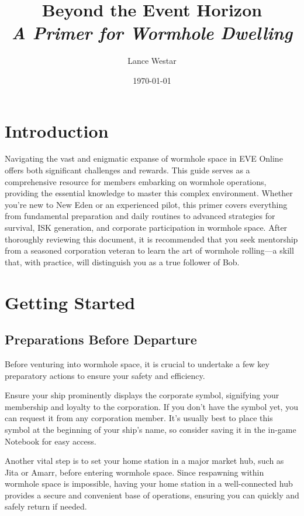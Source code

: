 \documentclass[a4paper,12pt]{report}
\title{Beyond the Event Horizon\\ \textit{\large A Primer for Wormhole Dwelling}}
\author{Lance Westar}
\date{\today}
\begin{document}
\maketitle

\tableofcontents
\newpage

\chapter{Introduction}

Navigating the vast and enigmatic expanse of wormhole space in EVE Online offers both significant challenges and rewards. This guide serves as a comprehensive resource for members embarking on wormhole operations, providing the essential knowledge to master this complex environment. Whether you're new to New Eden or an experienced pilot, this primer covers everything from fundamental preparation and daily routines to advanced strategies for survival, ISK generation, and corporate participation in wormhole space. After thoroughly reviewing this document, it is recommended that you seek mentorship from a seasoned corporation veteran to learn the art of wormhole rolling—a skill that, with practice, will distinguish you as a true follower of Bob.

\chapter{Getting Started}

\section{Preparations Before Departure}

Before venturing into wormhole space, it is crucial to undertake a few key preparatory actions to ensure your safety and efficiency.

Ensure your ship prominently displays the corporate symbol, signifying your membership and loyalty to the corporation. If you don't have the symbol yet, you can request it from any corporation member. It's usually best to place this symbol at the beginning of your ship's name, so consider saving it in the in-game Notebook for easy access.

Another vital step is to set your home station in a major market hub, such as Jita or Amarr, before entering wormhole space. Since respawning within wormhole space is impossible, having your home station in a well-connected hub provides a secure and convenient base of operations, ensuring you can quickly and safely return if needed.
\end{document}
